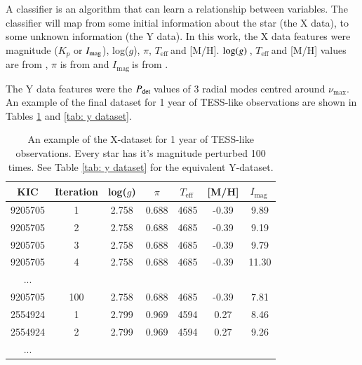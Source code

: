 \documentclass[a4paper,fleqn,usenatbib,useAMS]{mnras}
\newcommand{\numax}{\ensuremath{\nu_{\textrm{max}}}}
\newcommand{\teff}{\ensuremath{T_{\textrm{eff}}\:}}
\newcommand{\pdet}{\ensuremath{P_{\rm det}\:}}
\newcommand{\imag}{\ensuremath{I_{\textrm{mag}}\:}}
\newcommand{\logg}{\ensuremath{{\rm log}(g)\:}}
\begin{document}
A classifier is an algorithm that can learn a relationship between variables. The classifier will map from some initial information about the star (the X data), to some unknown information (the Y data). In this work, the X data features were magnitude ($K_{p}$ or $I_{\rm mag}$), log($g$), $\pi$, \teff and [M/H]. \logg, \teff and [M/H] values are from \citet{pinsonneault_apokasc_2014}, $\pi$ is from \citet{lindegren_gaia_2018} and \imag is from \citet{hog_tycho-2_2000}.

The Y data features were the \pdet values of 3 radial modes centred around \numax. An example of the final dataset for 1 year of TESS-like observations are shown in Tables \ref{tab: x dataset} and \ref{tab: y dataset}.


\begin{table}
\begin{center}
\begin{tabular}{|*{7}{c|}}
KIC     & Iteration & log($g$) & $\pi$ & \teff & [M/H] & \imag \\
\hline
9205705	& 1         & 2.758	& 0.688 & 4685 & -0.39 & 9.89  \\
9205705	& 2         & 2.758	& 0.688 & 4685 & -0.39 & 9.19  \\
9205705	& 3         & 2.758	& 0.688 & 4685 & -0.39 & 9.79  \\
9205705	& 4         & 2.758	& 0.688 & 4685 & -0.39 & 11.30 \\
...                                                        \\
9205705	& 100       & 2.758	& 0.688 & 4685 & -0.39 & 7.81  \\
2554924	& 1	        & 2.799	& 0.969 & 4594 &  0.27 & 8.46  \\
2554924	& 2         & 2.799	& 0.969 & 4594 &  0.27 & 9.26  \\
...                                                         \\
\hline
\end{tabular}
\end{center}
\caption{An example of the X-dataset for 1 year of TESS-like observations. Every star has it's magnitude perturbed 100 times. See Table \ref{tab: y dataset} for the equivalent Y-dataset.}
\label{tab: x dataset}
\end{table}
\end{document}
